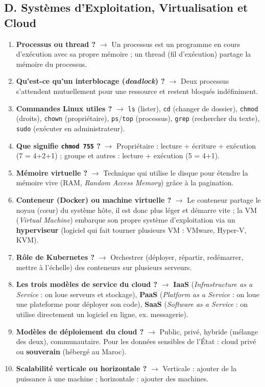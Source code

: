 \subsection*{D. Systèmes d'Exploitation, Virtualisation et Cloud}
\begin{enumerate}[leftmargin=*]
    \item \textbf{Processus ou thread ?} $\rightarrow$ Un processus est un programme en cours d'exécution avec sa propre mémoire ; un thread (fil d'exécution) partage la mémoire du processus.
    \item \textbf{Qu'est-ce qu'un interblocage (\textit{deadlock}) ?} $\rightarrow$ Deux processus s'attendent mutuellement pour une ressource et restent bloqués indéfiniment.
    \item \textbf{Commandes Linux utiles ?} $\rightarrow$ \texttt{ls} (lister), \texttt{cd} (changer de dossier), \texttt{chmod} (droits), \texttt{chown} (propriétaire), \texttt{ps}/\texttt{top} (processus), \texttt{grep} (rechercher du texte), \texttt{sudo} (exécuter en administrateur).
    \item \textbf{Que signifie \texttt{chmod 755} ?} $\rightarrow$ Propriétaire : lecture + écriture + exécution (7 = 4+2+1) ; groupe et autres : lecture + exécution (5 = 4+1).
    \item \textbf{Mémoire virtuelle ?} $\rightarrow$ Technique qui utilise le disque pour étendre la mémoire vive (RAM, \textit{Random Access Memory}) grâce à la pagination.
    \item \textbf{Conteneur (Docker) ou machine virtuelle ?} $\rightarrow$ Le conteneur partage le noyau (cœur) du système hôte, il est donc plus léger et démarre vite ; la VM (\textit{Virtual Machine}) embarque son propre système d'exploitation via un \textbf{hyperviseur} (logiciel qui fait tourner plusieurs VM : VMware, Hyper-V, KVM).
    \item \textbf{Rôle de Kubernetes ?} $\rightarrow$ Orchestrer (déployer, répartir, redémarrer, mettre à l'échelle) des conteneurs sur plusieurs serveurs.
    \item \textbf{Les trois modèles de service du cloud ?} $\rightarrow$ \textbf{IaaS} (\textit{Infrastructure as a Service} : on loue serveurs et stockage), \textbf{PaaS} (\textit{Platform as a Service} : on loue une plateforme pour déployer son code), \textbf{SaaS} (\textit{Software as a Service} : on utilise directement un logiciel en ligne, ex. messagerie).
    \item \textbf{Modèles de déploiement du cloud ?} $\rightarrow$ Public, privé, hybride (mélange des deux), communautaire. Pour les données sensibles de l'État : cloud privé ou \textbf{souverain} (hébergé au Maroc).
    \item \textbf{Scalabilité verticale ou horizontale ?} $\rightarrow$ Verticale : ajouter de la puissance à une machine ; horizontale : ajouter des machines.
\end{enumerate}


